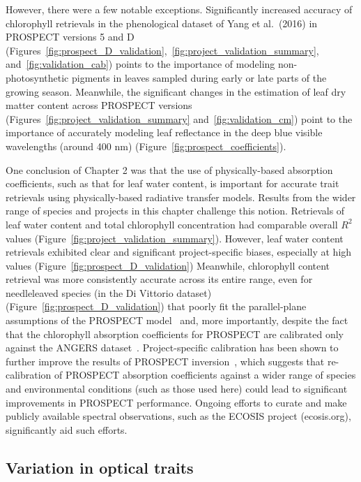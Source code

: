 However, there were a few notable exceptions.
Significantly increased accuracy of chlorophyll retrievals in the phenological dataset of Yang et al.~(2016) \nocite{yang_2016_seasonal} in PROSPECT versions 5 and D (Figures~\ref{fig:prospect_D_validation},~\ref{fig:project_validation_summary}, and~\ref{fig:validation_cab}) points to the importance of modeling non-photosynthetic pigments in leaves sampled during early or late parts of the growing season.
Meanwhile, the significant changes in the estimation of leaf dry matter content across PROSPECT versions (Figures~\ref{fig:project_validation_summary} and~\ref{fig:validation_cm}) point to the importance of accurately modeling leaf reflectance in the deep blue visible wavelengths (around 400 nm) (Figure~\ref{fig:prospect_coefficients}).

One conclusion of Chapter 2 was that the use of physically-based absorption coefficients, such as that for leaf water content, is important for accurate trait retrievals using physically-based radiative transfer models.
% 
% 
Results from the wider range of species and projects in this chapter challenge this notion.
Retrievals of leaf water content and total chlorophyll concentration had comparable overall $R^2$ values (Figure~\ref{fig:project_validation_summary}).
However, leaf water content retrievals exhibited clear and significant project-specific biases, especially at high values (Figure~\ref{fig:prospect_D_validation})
Meanwhile, chlorophyll content retrieval was more consistently accurate across its entire range, even for needleleaved species (in the Di Vittorio dataset) (Figure~\ref{fig:prospect_D_validation}) that poorly fit the parallel-plane assumptions of the PROSPECT model~\cite{allen_1969_interaction,jacquemoud_1990_prospect} and, more importantly, despite the fact that the chlorophyll absorption coefficients for PROSPECT are calibrated only against the ANGERS dataset~\cite{feret_2008_prospect,feret_2017_prospectd}.
Project-specific calibration has been shown to further improve the results of PROSPECT inversion~\cite{li_2013_retrieval}, which suggests that re-calibration of PROSPECT absorption coefficients against a wider range of species and environmental conditions (such as those used here) could lead to significant improvements in PROSPECT performance.
Ongoing efforts to curate and make publicly available spectral observations, such as the ECOSIS project (ecosis.org), significantly aid such efforts.

\subsection{Variation in optical traits}

